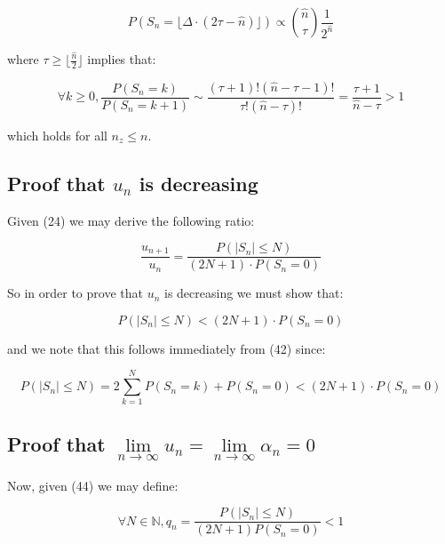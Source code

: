 \documentclass{article}
\begin{document}
\begin{equation}
P(S_{n}  = \lfloor \Delta \cdot (2\tau-\hat{n}) \rfloor)  \propto {\hat{n} \choose \tau} \frac{1}{2^{\hat{n}}}
\end{equation}

where $\tau \geq \lfloor \frac{\hat{n}}{2} \rfloor$ implies that:

\begin{equation}
\forall k \geq 0, \frac{P(S_n=k)}{P(S_n=k+1)} \sim \frac{(\tau+1)!(\hat{n}-\tau-1)!}{\tau!(\hat{n}-\tau)!} = \frac{\tau+1}{\hat{n}-\tau} > 1
\end{equation}

which holds for all $n_z \leq n$.

\newpage

\subsection{Proof that $u_n$ is decreasing}

Given (24) we may derive the following ratio:

\begin{equation}
	\frac{u_{n+1}}{u_n} = \frac{P(\lvert S_n \rvert \leq N)}{(2N+1) \cdot P(S_n = 0)}
\end{equation}

So in order to prove that $u_n$ is decreasing we must show that:

\begin{equation}
	P(\lvert S_n \rvert \leq N) < (2N+1) \cdot P(S_n=0)
\end{equation}

and we note that this follows immediately from (42) since:

\begin{equation}
	P(\lvert S_n \rvert \leq N) = 2 \sum_{k=1}^N P(S_n=k) + P(S_n=0) < (2N+1) \cdot P(S_n=0)
\end{equation}

\subsection{Proof that $\lim\limits_{n \to \infty} u_n = \lim\limits_{n \to \infty} \alpha_n = 0$}

Now, given (44) we may define:

\begin{equation}
\forall N \in \mathbb{N}, q_n = \frac{P(\lvert S_n \rvert \leq N)}{(2N+1)P(S_n=0)} < 1
\end{equation}
\end{document}
